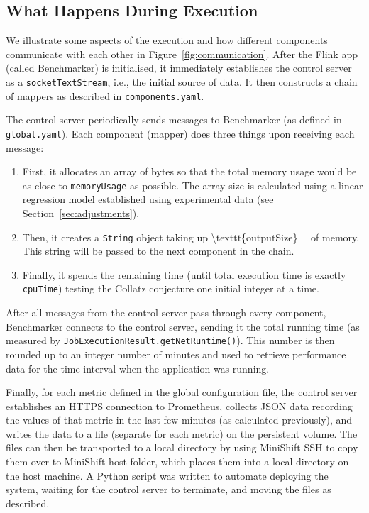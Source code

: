 \documentclass{article}
\begin{document}
\subsection{What Happens During Execution} \label{sec:execution}

We illustrate some aspects of the execution and how different components
communicate with each other in Figure~\ref{fig:communication}. After the Flink
app (called Benchmarker) is initialised, it immediately establishes the control
server as a \texttt{socketTextStream}, i.e., the initial source of data. It then
constructs a chain of mappers as described in \texttt{components.yaml}.

The control server periodically sends messages to Benchmarker (as defined in
\texttt{global.yaml}). Each component (mapper) does three things upon receiving
each message:
\begin{enumerate}
\item First, it allocates an array of bytes so that the total memory usage would
  be as close to \texttt{memoryUsage} as possible. The array size is calculated
  using a linear regression model established using experimental data (see
  Section~\ref{sec:adjustments}).
\item Then, it creates a \texttt{String} object taking up \SI[number-math-rm =
  \mathnormal, parse-numbers = false]{\texttt{outputSize}}{\kibi\byte} of
  memory. This string will be passed to the next component in the chain.
\item Finally, it spends the remaining time (until total execution time is
  exactly \texttt{cpuTime}) testing the Collatz conjecture \cite{collatz} one
  initial integer at a time.
\end{enumerate}

After all messages from the control server pass through every component,
Benchmarker connects to the control server, sending it the total running time
(as measured by \texttt{JobExecutionResult.getNetRuntime()}). This number is
then rounded up to an integer number of minutes and used to retrieve performance
data for the time interval when the application was running.

Finally, for each metric defined in the global configuration file, the control
server establishes an HTTPS connection to Prometheus, collects JSON data
recording the values of that metric in the last few minutes (as calculated
previously), and writes the data to a file (separate for each metric) on the
persistent volume. The files can then be transported to a local directory by
using MiniShift SSH to copy them over to MiniShift host folder, which places
them into a local directory on the host machine. A Python script was written to
automate deploying the system, waiting for the control server to terminate, and
moving the files as described.
\end{document}
